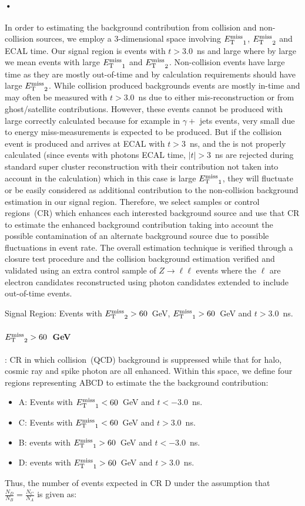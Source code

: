\paragraph*{•} 
\par
In order to estimating the background contribution from collision and non-collision sources, we employ a 3-dimensional space involving ${E_{\mathrm{T}}^{\text{miss}}}_{1}$, ${E_{\mathrm{T}}^{\text{miss}}}_{2}$ and ECAL time.  Our signal region is events with $t > 3.0$~ns and large \MET where by large \MET we mean events with  large  ${E_{\mathrm{T}}^{\text{miss}}}_{1}$ and  ${E_{\mathrm{T}}^{\text{miss}}}_{2}$. Non-collision events have large time as they are mostly out-of-time and by \MET calculation requirements should have large  ${E_{\mathrm{T}}^{\text{miss}}}_{2}$. While collision produced backgrounds events are mostly in-time and may often be measured with $t > 3.0$~ns due to either mis-reconstruction or from ghost/satellite contributions. However, these events cannot be produced with large correctly calculated \MET because for example in $\gamma +$ jets events, very small \MET due to energy miss-measurements is expected to be produced.
 But if the collision event is produced and arrives at ECAL with $t > 3$~ns, and the \MET is not properly calculated (since events with photons ECAL time, $|t| > 3$~ns are rejected during standard super cluster reconstruction with their \pt contribution  not taken into account in the \MET calculation) which in this case is large ${E_{\mathrm{T}}^{\text{miss}}}_{1}$, they will fluctuate or be easily considered as additional contribution to the non-collision background estimation in our signal region.
Therefore, we select samples or control regions~(CR) which enhances each interested background source and use that CR to estimate the enhanced background contribution taking into account the possible contamination of an alternate background source due to possible fluctuations in event rate.
The overall estimation technique is verified through a closure test procedure and the collision background estimation verified and validated using an extra control sample of $Z \rightarrow \ell \ell$ events where the $\ell$ are electron candidates reconstructed using photon candidates extended to include out-of-time events.

Signal Region: Events with ${E_{\mathrm{T}}^{\text{miss}}}_{2} > 60$~GeV, ${E_{\mathrm{T}}^{\text{miss}}}_{1} > 60$~GeV and $t > 3.0$~ns.
\paragraph*{${E_{\mathrm{T}}^{\text{miss}}}_{2} > 60$~GeV } : CR in which collision~(QCD) background is suppressed while that for halo, cosmic ray and spike photon are all enhanced.
Within this space, we define four regions representing ABCD to estimate the the background contribution:
\begin{itemize}
\item A: Events with ${E_{\mathrm{T}}^{\text{miss}}}_{1} < 60$~GeV and $t < -3.0$~ns.
\item C: Events with ${E_{\mathrm{T}}^{\text{miss}}}_{1} < 60$~GeV and $t >  3.0$~ns.
\item B: events with ${E_{\mathrm{T}}^{\text{miss}}}_{1} > 60$~GeV and $t < -3.0$~ns.
\item D: events with ${E_{\mathrm{T}}^{\text{miss}}}_{1} > 60$~GeV and $t >  3.0$~ns.
\end{itemize}
Thus, the number of events expected in CR D under the assumption that $\frac{N_{D}}{N_{B}} = \frac{N_{C}}{N_{A}}$  is given as:

